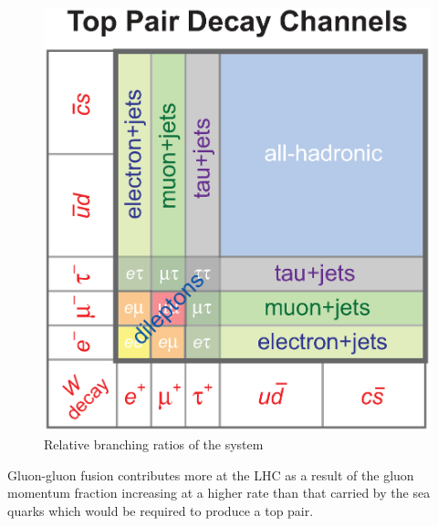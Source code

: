 \begin{figure}[hbtp]
   \centering
     \includegraphics[width=\textwidth]{Chapters/02_Theory/Images/top_pair_decay_channels.eps}\hfill
     \caption{Relative branching ratios of the \ttbar system}
     \label{fig:ttbar_branching_ratios}
\end{figure}

Gluon-gluon fusion contributes more at the LHC as a result of the gluon momentum fraction increasing at a
higher rate than that carried by the sea quarks which would be required to produce a top pair.